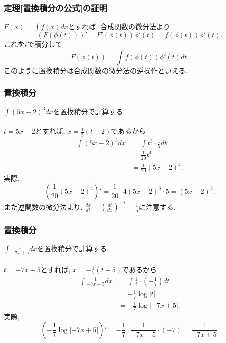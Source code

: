 \documentclass[dvipdfmx,cjk,10.2pt]{beamer}
\theoremstyle{definition}
\begin{document}



\begin{frame}
\frametitle{定理\ref{置換積分の公式}の証明}

$F(x)=\int f(x)dx$とすれば, 合成関数の微分法より
$$
(F(\phi(t)))'=F'(\phi(t))\phi'(t)=f(\phi(t))\phi'(t). 
$$
これを$t$で積分して
$$
F(\phi(t))= \int f(\phi(t))\phi'(t)dt. 
$$
このように置換積分は合成関数の微分法の逆操作といえる. 

\end{frame}







\begin{frame}
\frametitle{置換積分}

$\int (5x-2)^3dx$を置換積分で計算する. \\
\ \\

$t=5x-2$とすれば, $x=\frac{1}{5}(t+2)$であるから
\begin{align*}
\int (5x-2)^3dx  &= \int t^3 \cdot \frac{1}{5} dt \\
& = \frac{1}{20} t^4 \\
& = \frac{1}{20}(5x-2)^4. 
\end{align*}
実際,
$$
(\frac{1}{20}(5x-2)^4)' = \frac{1}{20} \cdot 4(5x-2)^3\cdot 5=(5x-2)^3. 
$$
また逆関数の微分法より, $\frac{dx}{dt}=(\frac{dt}{dx})^{-1}=\frac{1}{5}$に注意する. 
\end{frame}








\begin{frame}
\frametitle{置換積分}

$\int \frac{1}{-7x+5}dx$を置換積分で計算する. \\
\ \\

$t=-7x+5$とすれば, $x=-\frac{1}{7}(t-5)$であるから
\begin{align*}
\int \frac{1}{-7x+5}dx &= \int \frac{1}{t} \cdot (-\frac{1}{7}) dt \\
& = -\frac{1}{7} \log|t| \\
& =  -\frac{1}{7} \log|-7x+5|. 
\end{align*}
実際,
$$
(-\frac{1}{7} \log|-7x+5|)' = -\frac{1}{7} \cdot \frac{1}{-7x+5}\cdot (-7)= \frac{1}{-7x+5}. 
$$

\end{frame}
\end{document}
